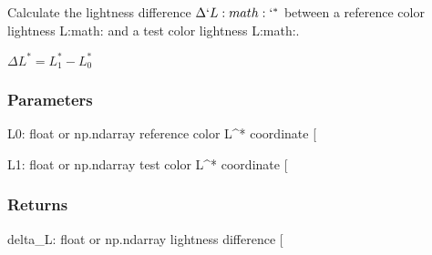 \documentclass[letterpaper,10pt,english]{sphinxmanual}
\begin{document}

\begin{fulllineitems}
\label{\detokenize{07_colors:skinoptics.colors.Delta_L}}
\pysigstartsignatures
{}
\pysigstopsignatures
\sphinxAtStartPar
Calculate the lightness difference \(\Delta`L:math:`^*\) between a reference color lightness L:math:
and a test color lightness L:math:.

\sphinxAtStartPar
\(\Delta L^* = L^*_1 - L^*_0\)


\subsubsection{Parameters}
\label{\detokenize{07_colors:id1}}
\sphinxAtStartPar
L0: float or np.ndarray
reference color L\textasciicircum{}* coordinate {[}\sphinxhyphen{}{]}

\sphinxAtStartPar
L1: float or np.ndarray
test color L\textasciicircum{}* coordinate {[}\sphinxhyphen{}{]}


\subsubsection{Returns}
\label{\detokenize{07_colors:id2}}
\sphinxAtStartPar
delta\_L: float or np.ndarray
lightness difference {[}\sphinxhyphen{}{]}

\end{fulllineitems}

\end{document}
